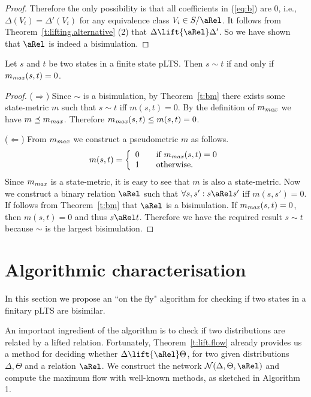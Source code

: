 \documentclass{article}
\def \BISI{\sim}
\def \CN{{\cal N}}
\begin{document}
\begin{proof}
Therefore the only possibility is that all coefficients in
(\ref{eq:b}) are $0$, i.e., $\Delta(V_i)=\Delta'(V_i)$ for any
equivalence class $V_i\in S/\aRel$. It follows from
Theorem~\ref{t:lifting.alternative} (2) that
$\Delta\lift{\aRel}\Delta'$. So we have shown that $\aRel$ is indeed
a bisimulation.
\end{proof}

\begin{corollary}\label{c:bimx}
Let $s$ and $t$ be two states in a finite state pLTS. Then $s\BISI
t$ if and only if $m_{\it max}(s,t)=0$.
\end{corollary}
\begin{proof}
($\Rightarrow$) Since $\BISI$ is a bisimulation, by
Theorem~\ref{t:bm} there exists some state-metric $m$ such that
$s\BISI t$ iff $m(s,t)=0$. By the definition of $m_{\it max}$ we
have $m\preceq m_{\it max}$. Therefore $m_{\it max}(s,t)\leq
m(s,t)=0$.

($\Leftarrow$) From $m_{\it max}$ we construct a pseudometric $m$ as
follows.
\[m(s,t)=\left\{\begin{array}{ll}
                 0 \quad& \mbox{if $m_{\it max}(s,t)=0$}\\
                 1 & \mbox{otherwise.}
                \end{array}\right.\]
Since $m_{\it max}$ is a state-metric, it is easy to see that $m$ is
also a state-metric. Now we construct a binary relation $\aRel$ such
that $\forall s,s': s\aRel s'$ iff $m(s,s')=0$. If follows from
Theorem~\ref{t:bm} that $\aRel$ is a bisimulation. If $m_{\it
  max}(s,t)=0$, then $m(s,t)=0$ and thus $s\aRel t$. Therefore we have
the required result $s\BISI t$ because $\BISI$ is the largest
bisimulation.
\end{proof}




\section{Algorithmic characterisation}\label{s:algo}
In this section we propose an ``on the fly" algorithm for checking
if two states in a finitary pLTS are  bisimilar.

An important ingredient of the algorithm is to check if two
distributions are related by a lifted relation. Fortunately,
Theorem~\ref{t:lift.flow} already provides us a method for deciding
whether $\Delta\lift{\aRel}\Theta$, for two given distributions
$\Delta,\Theta$ and a relation $\aRel$. We construct the network
$\CN(\Delta,\Theta,\aRel)$ and compute the maximum flow with
well-known methods, as sketched in
Algorithm 1.
\end{document}
